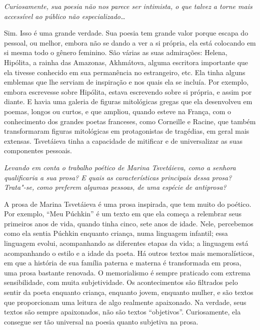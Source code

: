 \medskip

\emph{Curiosamente, sua poesia não nos parece ser
intimista, o que talvez a torne mais accessível ao público não
especializado\ldots{}}

Sim. Isso é uma grande verdade. Sua poesia tem grande
valor porque escapa do pessoal, ou melhor, embora não se dando a ver a
si própria, ela está colocando em si mesma todo o gênero feminino. São
várias as suas admirações: Helena, Hipólita, a rainha das Amazonas,
Akhmátova, alguma escritora importante que ela tivesse conhecido em sua
permanência no estrangeiro, etc. Ela tinha alguns emblemas que lhe
serviam de inspiração e nos quais ela se incluía. Por exemplo, embora
escrevesse sobre Hipólita, estava escrevendo sobre si própria, e assim
por diante. E havia uma galeria de figuras mitológicas gregas que ela
desenvolveu em poemas, longos ou curtos, e que ampliou, quando esteve na
França, com o conhecimento dos grandes poetas franceses, como Corneille
e Racine, que também transformaram figuras mitológicas em protagonistas
de tragédias, em geral mais extensas. Tsvetáieva tinha a capacidade de
mitificar e de universalizar as suas componentes pessoais.

\medskip

\emph{Levando em conta o trabalho poético de Marina
Tsvetáieva, como a senhora qualificaria a sua prosa? E quais as
características principais dessa prosa? Trata"-se, como preferem algumas
pessoas, de uma espécie de antiprosa?}

A prosa de Marina Tsvetáieva é uma prosa inspirada, que
tem muito do poético. Por exemplo, ``Meu Púchkin'' é um texto em que ela
começa a relembrar seus primeiros anos de vida, quando tinha cinco, sete
anos de idade. Nele, percebemos como ela sentia Púchkin enquanto
criança, numa linguagem infantil; essa linguagem evolui, acompanhando as
diferentes etapas da vida; a linguagem está acompanhando o estilo e a
idade da poeta. Há outros textos mais memoralísticos, em que a história
de sua família paterna e materna é transformada em prosa, uma prosa
bastante renovada. O memorialismo é sempre praticado com extrema
sensibilidade, com muita subjetividade. Os acontecimentos são filtrados
pelo sentir da poeta enquanto criança, enquanto jovem, enquanto mulher,
e são textos que proporcionam uma leitura de algo realmente apaixonado.
Na verdade, seus textos são sempre apaixonados, não são textos
``objetivos''. Curiosamente, ela consegue ser tão universal na poesia
quanto subjetiva na prosa.

